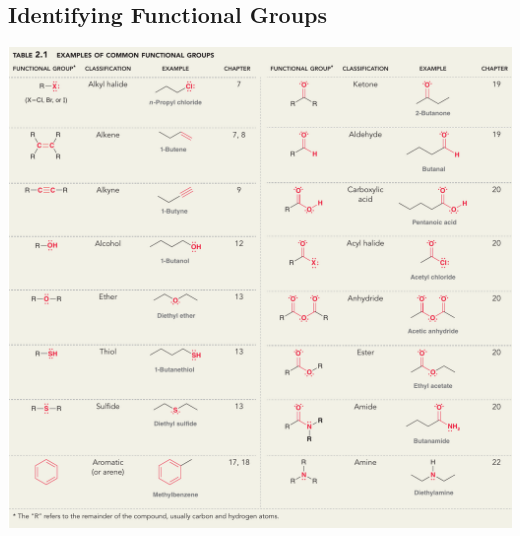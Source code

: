 \documentclass[12pt,a4paper]{article}
\begin{document}
\subsection{Identifying Functional Groups}
\begin{center}
    \includegraphics[scale=0.41]{images/fig2-1.png}
\end{center}
\end{document}
